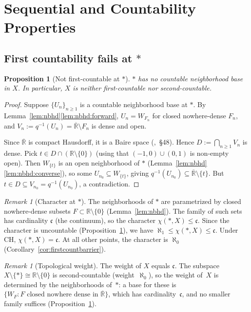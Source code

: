 \documentclass[11pt]{article}
\newtheorem{proposition}[theorem]{Proposition}
\theoremstyle{definition}
\theoremstyle{remark}
\newtheorem{remark}[theorem]{Remark}
\begin{document}
\section{Sequential and Countability Properties}\label{sec:countseq}

\subsection{First countability fails at
\texorpdfstring{$\ast$}{*}}

\begin{proposition}[Not first-countable at $\ast$]
\label{prop:notfirst}
$\ast$ has no countable neighborhood base in $X$.
In particular, $X$ is neither first-countable nor second-countable.
\end{proposition}
\begin{proof}
Suppose $\{U_n\}_{n \geq 1}$ is a countable neighborhood base at
$\ast$.
By Lemma~\ref{lem:nbhd}\ref{lem:nbhd:forward}, $U_n = W_{F_n}$ for
closed nowhere-dense $F_n$, and
$V_n := q^{-1}(U_n) = \overline{\mathbb{R}} \setminus F_n$ is dense
and open.

Since $\overline{\mathbb{R}}$ is compact Hausdorff, it is a Baire space
(\cite{bib:munkres},~\S48).
Hence $D := \bigcap_{n \ge 1} V_n$ is dense.
Pick $t \in D \cap (\mathbb{R}\setminus\{0\})$ (using that
$(-1,0)\cup(0,1)$ is non-empty open).
Then $W_{\{t\}}$ is an open neighborhood of $\ast$
(Lemma~\ref{lem:nbhd}\ref{lem:nbhd:converse}), so some
$U_{n_0} \subseteq W_{\{t\}}$, giving
$q^{-1}(U_{n_0}) \subseteq \overline{\mathbb{R}}\setminus\{t\}$.
But $t \in D \subseteq V_{n_0} = q^{-1}(U_{n_0})$, a contradiction.
\end{proof}

\begin{remark}[Character at $\ast$]\label{rem:character}
The neighborhoods of $\ast$ are parametrized by closed nowhere-dense
subsets $F \subset \mathbb{R}\setminus\{0\}$
(Lemma~\ref{lem:nbhd}).
The family of such sets has cardinality $\mathfrak{c}$
(the continuum), so the character
$\chi(\ast, X) \leq \mathfrak{c}$.
Since the character is uncountable
(Proposition~\ref{prop:notfirst}), we have
$\aleph_1 \leq \chi(\ast, X) \leq \mathfrak{c}$.
Under CH, $\chi(\ast, X) = \mathfrak{c}$.
At all other points, the character is $\aleph_0$
(Corollary~\ref{cor:firstcountbarrier}).
\end{remark}

\begin{remark}[Topological weight]\label{rmk:weight}
The weight of $X$ equals $\mathfrak{c}$.
The subspace $X \setminus \{\ast\} \cong \mathbb{R}\setminus\{0\}$ is
second-countable (weight~$\aleph_0$), so the weight of~$X$ is determined
by the neighborhoods of~$\ast$: a base for these is
$\{W_F : F \text{ closed nowhere dense in } \overline{\mathbb{R}}\}$,
which has cardinality~$\mathfrak{c}$, and no smaller family suffices
(Proposition~\ref{prop:notfirst}).
\end{remark}
\end{document}
